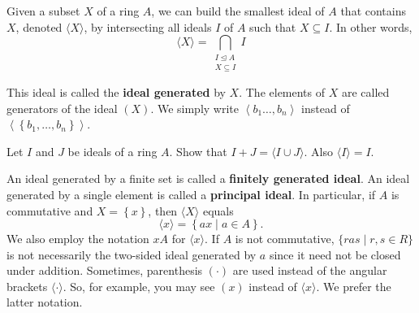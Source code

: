 \documentclass[11pt,a4paper]{article}
\begin{document}
Given a subset \(X\) of a ring \(A\), we can build the smallest ideal of \(A\) that contains \(X\), denoted \(\langle X\rangle\), by intersecting all ideals \(I\) of \(A\) such that \(X\subseteq I\).
In other words,
\[
\langle X \rangle = \mathop{\bigcap}\limits_{\substack{I \trianglelefteq A \\ X \subseteq I}} I
\]

This ideal is called the \textbf{ideal generated} by \(X\).
The elements of $X$ are called generators of the ideal $(X)$.
We simply write $\left\langle b_1 \ldots, b_n\right\rangle$ instead of $\left\langle\left\{b_1, \ldots, b_n\right\}\right\rangle$.
\begin{eje}
    Let \(I\) and \(J\) be ideals of a ring \(A\).
    Show that \(I+J=\langle I \cup J\rangle\). Also \(\langle I\rangle = I\).
\end{eje}

An ideal generated by a finite set is called a \textbf{finitely generated ideal}.
An ideal generated by a single element is called a \textbf{principal ideal}.
In particular, if \(A\) is commutative and  \(X = \left\{ x \right\}\), then \(\langle X \rangle\) equals  
\[\langle x\rangle = \left\{ ax\mid a\in A \right\}.\]
We also employ the notation \(xA\) for \(\langle x\rangle\).
If $A$ is not commutative, $\{r a s \mid r, s \in R\}$ is not necessarily the two-sided ideal generated by $a$ since it need not be closed under addition.
Sometimes, parenthesis \((\cdot)\) are used instead of the angular brackets \(\langle \cdot \rangle\).
So, for example, you may see \((x)\) instead of \(\langle x\rangle\).
We prefer the latter notation.
\end{document}
